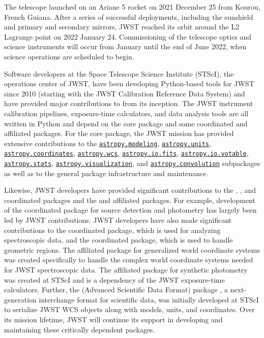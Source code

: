 \documentclass[modern]{aastex631}
\newcommand{\astropysubpkg}[1]{\href{http://docs.astropy.org/en/stable/#1/index.html}{\texttt{astropy.#1}}\xspace}
\begin{document}
The telescope launched on an Ariane 5 rocket on 2021 December 25 from
Kourou, French Guiana. After a series of successful deployments,
including the sunshield and primary and secondary mirrors, JWST reached
its orbit around the L2 Lagrange point on 2022 January 24. Commissioning
of the telescope optics and science instruments will occur from January
until the end of June 2022, when science operations are scheduled to
begin.

Software developers at the Space Telescope Science Institute (STScI),
the operations center of JWST, have been developing Python-based tools
for JWST since 2010 (starting with the JWST Calibration Reference Data
System) and have provided major contributions to \astropy from its
inception. The JWST instrument calibration pipelines, exposure-time
calculators, and data analysis tools are all written in Python and
depend on the \astropypkg core package and some coordinated and
affiliated packages. For the \astropypkg core package, the JWST mission
has provided extensive contributions to the \astropysubpkg{modeling},
\astropysubpkg{units}, \astropysubpkg{coordinates}, \astropysubpkg{wcs},
\astropysubpkg{io.fits}, \astropysubpkg{io.votable},
\astropysubpkg{stats}, \astropysubpkg{visualization}, and
\astropysubpkg{convolution} subpackages as well as to the general
package infrastructure and maintenance.

Likewise, JWST developers have provided significant contributions
to the  \citep{photutils}, 
\citep{specutils}, and  \citep{regions} coordinated
packages and the  \citep{gwcs} and 
\citep{synphot} affiliated packages. For example, development of the
 coordinated package for source detection and
photometry has largely been led by JWST contributions. JWST developers
have also made significant contributions to the 
coordinated package, which is used for analyzing spectroscopic data,
and the  coordinated package, which is used to
handle geometric regions. The  affiliated package for
generalized world coordinate systems was created specifically to handle
the complex world coordinate systems needed for JWST spectroscopic
data. The  affiliated package for synthetic photometry
was created at STScI and is a dependency of the JWST exposure-time
calculators. Further, the  (Advanced Scientific Data
Format) package \citep{ASDF}, a next-generation interchange format for
scientific data, was initially developed at STScI to serialize JWST WCS
objects along with \astropypkg models, units, and coordinates. Over
its mission lifetime, JWST will continue its support in developing and
maintaining these critically dependent packages.
\end{document}
